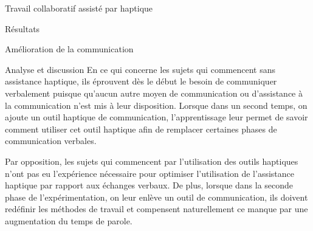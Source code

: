 \documentclass[myfrancais,ngerman,english,frenchb]{mythesis}
\begin{document}
\begin{mychapter}{Travail collaboratif assisté par haptique}
\begin{mysection}{Résultats}
\begin{mysubsection}{Amélioration de la communication}
\begin{mysubsubsection}{Analyse et discussion}
					En ce qui concerne les sujets qui commencent sans assistance haptique, ils éprouvent dès le début le besoin de communiquer verbalement puisque qu'aucun autre moyen de communication ou d'assistance à la communication n'est mis à leur disposition.
					Lorsque dans un second temps, on ajoute un outil haptique de communication, l'apprentissage leur permet de savoir comment utiliser cet outil haptique afin de remplacer certaines phases de communication verbales.

					Par opposition, les sujets qui commencent par l'utilisation des outils haptiques n'ont pas eu l'expérience nécessaire pour optimiser l'utilisation de l'assistance haptique par rapport aux échanges verbaux.
					De plus, lorsque dans la seconde phase de l'expérimentation, on leur enlève un outil de communication, ils doivent redéfinir les méthodes de travail et compensent naturellement ce manque par une augmentation du temps de parole.


\end{mysubsubsection}
\end{mysubsection}
\end{mysection}
\end{mychapter}
\end{document}
